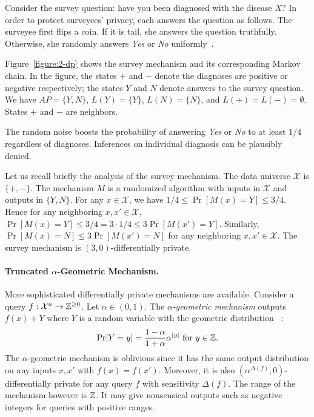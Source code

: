 Consider the survey question: have you been diagnosed
with the disease $X$? In order to protect surveyees' privacy, each
answers the question as follows. The surveyee first flips a
coin. If it is tail, she answers the question truthfully. Otherwise,
she randomly answers \textit{Yes} or \textit{No}
uniformly~\cite{DR:14:AFDP}.

\begin{example}\label{exa:survey}
  Figure~\ref{figure:2-dp} shows the survey
mechanism and its corresponding Markov chain. In the figure, the states
$+$ and $-$ denote the diagnoses are positive or negative
respectively; the states $Y$ and $N$ denote answers to the survey
question. We have $AP=\{Y,N\}$, $L(Y)=\{Y\}$, $L(N)=\{N\}$, and $L(+)=L(-)=\emptyset$. States $+$ and $-$ are neighbors.

The random noise boosts the probability of answering
\textit{Yes} or \textit{No} to at least $1/4$ regardless of
diagnoses. Inferences on individual diagnosis can be plausibly denied.
\end{example}

Let us recall briefly the analysis of the survey mechanism. The data universe
$\mathcal{X}$ is $\{ +, - \}$. The mechanism $M$ is a randomized
algorithm with inputs in $\mathcal{X}$ and outputs in $\{ Y, N
\}$. For any $x \in \mathcal{X}$, we have $1/4 \leq \Pr[M(x) = Y] \leq
3/4$. Hence for any neighboring $x, x' \in \mathcal{X}$, $\Pr[M(x) =
Y] \leq 3/4 = 3 \cdot 1/4 \leq 3 \Pr[M (x') =
Y]$. Similarly, $\Pr[M (x) = N] \leq 3 \Pr[M (x') = N]$ for any
neighboring $x, x' \in \mathcal{X}$. The survey mechanism is
$(3, 0)$-differentially private.

\paragraph{Truncated $\alpha$-Geometric Mechanism.}
More sophisticated differentially private mechanisms are
available. Consider a query
$f : \mathcal{X}^n \rightarrow \mathbb{Z}^{\geq 0}$. Let $\alpha \in (0, 1)$.
The \emph{$\alpha$-geometric mechanism}
outputs $f(x) + Y$ where $Y$ is a random variable with the geometric
distribution~\cite{GRS:09:UUPM,GRS:12:UUPM} :
\[
\Pr[Y = y] = \frac{1 - \alpha}{1 + \alpha}\alpha^{|y|}
\textmd{ for } y \in \mathbb{Z}.
\]
The $\alpha$-geometric mechanism is oblivious since it has the same
output distribution on any inputs $x, x'$ with $f (x) = f
(x')$. Moreover, it is also $(\alpha^{\Delta (f)}, 0)$-differentially
private for any query $f$ with sensitivity $\Delta (f)$. The range of
the mechanism
however is $\mathbb{Z}$. It may give nonsensical outputs such as
negative integers for queries with positive ranges.

